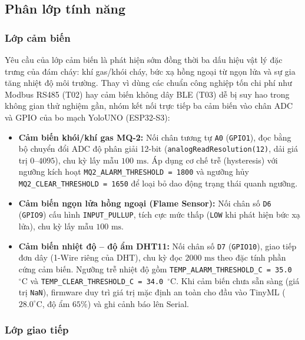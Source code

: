 \subsection{Phân lớp tính năng}
\label{subsec:phan-lop-tinh-nang}

\subsubsection{Lớp cảm biến}
\label{subsubsec:lop-cam-bien}

Yêu cầu của lớp cảm biến là phát hiện sớm đồng thời ba dấu hiệu vật lý đặc trưng của đám cháy: khí gas/khói cháy, bức xạ hồng ngoại từ ngọn lửa và sự gia tăng nhiệt độ môi trường. Thay vì dùng các chuẩn công nghiệp tốn chi phí như Modbus RS485 (T02) hay cảm biến không dây BLE (T03) dễ bị suy hao trong không gian thử nghiệm gần, nhóm kết nối trực tiếp ba cảm biến vào chân ADC và GPIO của bo mạch YoloUNO (ESP32-S3):

\begin{itemize}[leftmargin=*, itemsep=3pt]
  \item \textbf{Cảm biến khói/khí gas MQ-2:} Nối chân tương tự \texttt{A0} (\texttt{GPIO1}), đọc bằng bộ chuyển đổi ADC độ phân giải 12-bit (\texttt{analogReadResolution(12)}, dải giá trị $0$--$4095$), chu kỳ lấy mẫu $100\text{ ms}$. Áp dụng cơ chế trễ (hysteresis) với ngưỡng kích hoạt \texttt{MQ2\_ALARM\_THRESHOLD = 1800} và ngưỡng hủy \texttt{MQ2\_CLEAR\_THRESHOLD = 1650} để loại bỏ dao động trạng thái quanh ngưỡng.
  \item \textbf{Cảm biến ngọn lửa hồng ngoại (Flame Sensor):} Nối chân số \texttt{D6} (\texttt{GPIO9}) cấu hình \texttt{INPUT\_PULLUP}, tích cực mức thấp (\texttt{LOW} khi phát hiện bức xạ lửa), chu kỳ lấy mẫu $100\text{ ms}$.
  \item \textbf{Cảm biến nhiệt độ -- độ ẩm DHT11:} Nối chân số \texttt{D7} (\texttt{GPIO10}), giao tiếp đơn dây (1-Wire riêng của DHT), chu kỳ đọc $2000\text{ ms}$ theo đặc tính phần cứng cảm biến. Ngưỡng trễ nhiệt độ gồm \texttt{TEMP\_ALARM\_THRESHOLD\_C = 35.0}~$^\circ\text{C}$ và \texttt{TEMP\_CLEAR\_THRESHOLD\_C = 34.0}~$^\circ\text{C}$. Khi cảm biến chưa sẵn sàng (giá trị \texttt{NaN}), firmware duy trì giá trị mặc định an toàn cho đầu vào TinyML ($28.0^\circ\text{C}$, độ ẩm $65\%$) và ghi cảnh báo lên Serial.
\end{itemize}

\subsubsection{Lớp giao tiếp}
\label{subsubsec:lop-giao-tiep}

